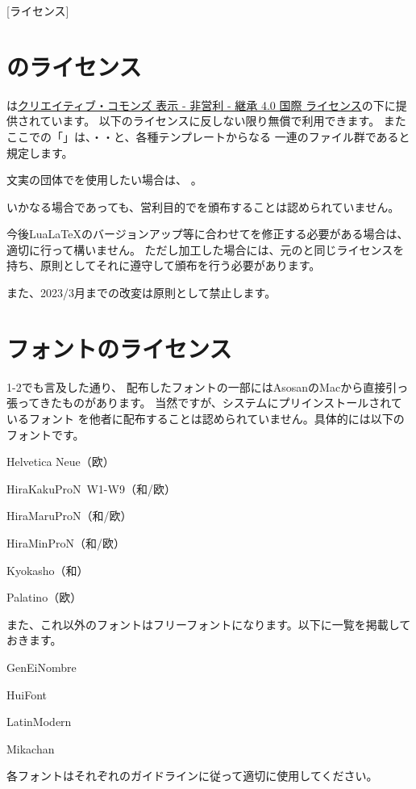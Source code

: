 \newpage
\pagestyle{leaflet}
[ライセンス]
\begin{multicols*}{2}
\section{\BunTeX のライセンス}
\BunTeX は\href{https://creativecommons.org/licenses/by-nc-sa/4.0/}{クリエイティブ・コモンズ 表示 - 非営利 - 継承 4.0 国際 ライセンス}の下に提供されています。
以下のライセンスに反しない限り無償で利用できます。
またここでの「\BunTeX 」は、{\BunTeXB}・{\BunTeXC}・{\BunTeXD}と、各種テンプレートからなる
一連のファイル群であると規定します。

文実の団体で\BunTeX を使用したい場合は、
。

いかなる場合であっても、営利目的で\BunTeX を頒布することは認められていません。

今後Lua\LaTeX のバージョンアップ等に合わせて\BunTeX を修正する必要がある場合は、
適切に行って構いません。
ただし加工した場合には、元の\BunTeX と同じライセンスを持ち、原則としてそれに遵守して頒布を行う必要があります。

また、2023/3月までの改変は原則として禁止します。


\section{フォントのライセンス}
1-2でも言及した通り、
配布したフォントの一部にはAsosanのMacから直接引っ張ってきたものがあります。
当然ですが、システムにプリインストールされているフォント
を他者に配布することは認められていません。具体的には以下のフォントです。
\begin{reitemize}
    \item Helvetica Neue（欧）
    \item HiraKakuProN~W1-W9（和/欧）
    \item HiraMaruProN（和/欧）
    \item HiraMinProN（和/欧）
    \item Kyokasho（和）
    \item Palatino（欧）
\end{reitemize}

また、これ以外のフォントはフリーフォントになります。以下に一覧を掲載しておきます。
\begin{reitemize}
    \item GenEiNombre
    \item HuiFont
    \item LatinModern
    \item Mikachan
\end{reitemize}
各フォントはそれぞれのガイドラインに従って適切に使用してください。

\end{multicols*}